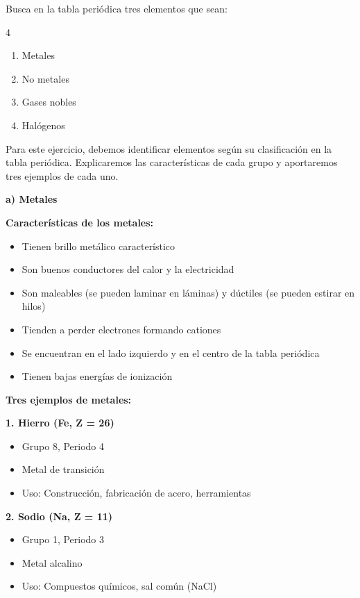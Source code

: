 \begin{exercise}
    Busca en la tabla periódica tres elementos que sean:
    \begin{multicols}{4}
        \begin{enumerate}[label=\letraminuscula]
    \item Metales
    \item No metales
    \item Gases nobles
    \item Halógenos
        \end{enumerate}
    \end{multicols}
    \begin{solu}
        Para este ejercicio, debemos identificar elementos según su clasificación en la tabla periódica. Explicaremos las características de cada grupo y aportaremos tres ejemplos de cada uno.

        \textbf{a) Metales}

        \textbf{Características de los metales:}
        \begin{itemize}
            \item Tienen brillo metálico característico
            \item Son buenos conductores del calor y la electricidad
            \item Son maleables (se pueden laminar en láminas) y dúctiles (se pueden estirar en hilos)
            \item Tienden a perder electrones formando cationes
            \item Se encuentran en el lado izquierdo y en el centro de la tabla periódica
            \item Tienen bajas energías de ionización
        \end{itemize}

        \textbf{Tres ejemplos de metales:}

        \textbf{1. Hierro (Fe, Z = 26)}
        \begin{itemize}
            \item Grupo 8, Periodo 4
            \item Metal de transición
            \item Uso: Construcción, fabricación de acero, herramientas
        \end{itemize}

        \textbf{2. Sodio (Na, Z = 11)}
        \begin{itemize}
            \item Grupo 1, Periodo 3
            \item Metal alcalino
            \item Uso: Compuestos químicos, sal común (NaCl)
        \end{itemize}


\end{solu}
\end{exercise}
